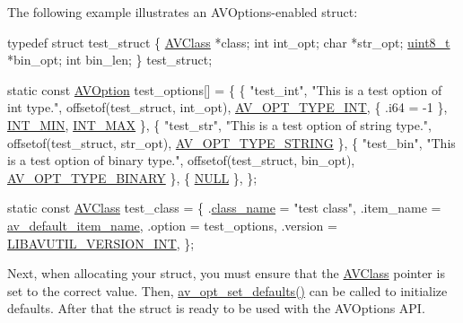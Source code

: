 The following example illustrates an A\+V\+Options-\/enabled struct\+: 
\begin{DoxyCode}
\textcolor{keyword}{typedef} \textcolor{keyword}{struct }test\_struct \{
    \hyperlink{struct_a_v_class}{AVClass} *\textcolor{keyword}{class};
    \textcolor{keywordtype}{int}      int\_opt;
    \textcolor{keywordtype}{char}    *str\_opt;
    \hyperlink{lib-src_2ffmpeg_2win32_2stdint_8h_a9a941819355e6f658991890ff66b4b0e}{uint8\_t} *bin\_opt;
    \textcolor{keywordtype}{int}      bin\_len;
\} test\_struct;

\textcolor{keyword}{static} \textcolor{keyword}{const} \hyperlink{struct_a_v_option}{AVOption} test\_options[] = \{
  \{ \textcolor{stringliteral}{"test\_int"}, \textcolor{stringliteral}{"This is a test option of int type."}, offsetof(test\_struct, int\_opt),
    \hyperlink{group__avoptions_ggabd75aa30eb8ad6387672df9a1fa79444ac068b8f6afeeb293a13aeabb5d702411}{AV\_OPT\_TYPE\_INT}, \{ .i64 = -1 \}, \hyperlink{macint_8h_a21658776274b3d146c674318b635a334}{INT\_MIN}, \hyperlink{macint_8h_a9ec306f36d50c7375e74f0d1c55a3a67}{INT\_MAX} \},
  \{ \textcolor{stringliteral}{"test\_str"}, \textcolor{stringliteral}{"This is a test option of string type."}, offsetof(test\_struct, str\_opt),
    \hyperlink{group__avoptions_ggabd75aa30eb8ad6387672df9a1fa79444afadddce95ad3b690dd38644b458b96c4}{AV\_OPT\_TYPE\_STRING} \},
  \{ \textcolor{stringliteral}{"test\_bin"}, \textcolor{stringliteral}{"This is a test option of binary type."}, offsetof(test\_struct, bin\_opt),
    \hyperlink{group__avoptions_ggabd75aa30eb8ad6387672df9a1fa79444a2689966edbe494482dfdfaa4efdf95d3}{AV\_OPT\_TYPE\_BINARY} \},
  \{ \hyperlink{getopt1_8c_a070d2ce7b6bb7e5c05602aa8c308d0c4}{NULL} \},
\};

\textcolor{keyword}{static} \textcolor{keyword}{const} \hyperlink{struct_a_v_class}{AVClass} test\_class = \{
    .\hyperlink{struct_a_v_class_aa8883e113a3f2965abd008f7667db7eb}{class\_name} = \textcolor{stringliteral}{"test class"},
    .item\_name  = \hyperlink{group__lavu__log_ga791fcd0dba1d19fe0c3677509344328e}{av\_default\_item\_name},
    .option     = test\_options,
    .version    = \hyperlink{group__lavu__ver_ga36e17e3fc9bcbe5c55820a8ac8b47e3c}{LIBAVUTIL\_VERSION\_INT},
\};
\end{DoxyCode}


Next, when allocating your struct, you must ensure that the \hyperlink{struct_a_v_class}{A\+V\+Class} pointer is set to the correct value. Then, \hyperlink{group__avoptions_gad4ca968e9058b39b2da630ad0a091bdb}{av\+\_\+opt\+\_\+set\+\_\+defaults()} can be called to initialize defaults. After that the struct is ready to be used with the A\+V\+Options A\+PI.

